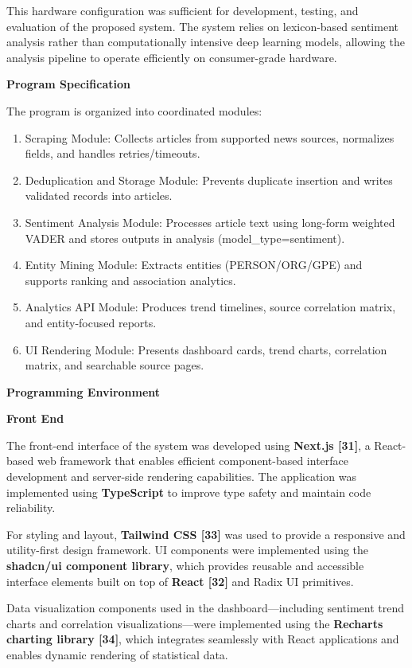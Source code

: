 This hardware configuration was sufficient for development, testing, and evaluation of the proposed system. The system relies on lexicon-based sentiment analysis rather than computationally intensive deep learning models, allowing the analysis pipeline to operate efficiently on consumer-grade hardware.

\textbf{Program Specification}

The program is organized into coordinated modules:

\begin{enumerate}
\def\labelenumi{\arabic{enumi}.}
\item
  Scraping Module: Collects articles from supported news sources, normalizes fields, and handles retries/timeouts.
\item
  Deduplication and Storage Module: Prevents duplicate insertion and writes validated records into articles.
\item
  Sentiment Analysis Module: Processes article text using long-form weighted VADER and stores outputs in analysis (model\_type=sentiment).
\item
  Entity Mining Module: Extracts entities (PERSON/ORG/GPE) and supports ranking and association analytics.
\item
  Analytics API Module: Produces trend timelines, source correlation matrix, and entity-focused reports.
\item
  UI Rendering Module: Presents dashboard cards, trend charts, correlation matrix, and searchable source pages.
\end{enumerate}

\textbf{Programming Environment}

\textbf{Front End}

The front-end interface of the system was developed using \textbf{Next.js {[}31{]}}, a React-based web framework that enables efficient component-based interface development and server-side rendering capabilities. The application was implemented using \textbf{TypeScript} to improve type safety and maintain code reliability.

For styling and layout, \textbf{Tailwind CSS {[}33{]}} was used to provide a responsive and utility-first design framework. UI components were implemented using the \textbf{shadcn/ui component library}, which provides reusable and accessible interface elements built on top of \textbf{React {[}32{]}} and Radix UI primitives.

Data visualization components used in the dashboard---including sentiment trend charts and correlation visualizations---were implemented using the \textbf{Recharts charting library {[}34{]}}, which integrates seamlessly with React applications and enables dynamic rendering of statistical data.

